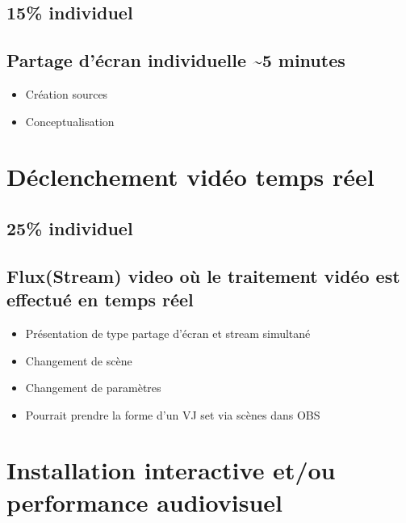 \documentclass[
]{book}
\providecommand{\tightlist}{%
  \setlength{\itemsep}{0pt}\setlength{\parskip}{0pt}}
\begin{document}
\hypertarget{individuel-3}{%
\subsection{15\% individuel}\label{individuel-3}}

\hypertarget{partage-duxe9cran-individuelle-5-minutes}{%
\subsection{Partage d'écran individuelle \textasciitilde5 minutes}\label{partage-duxe9cran-individuelle-5-minutes}}

\begin{itemize}
\tightlist
\item
  Création sources
\item
  Conceptualisation
\end{itemize}

\hypertarget{evaluation_5}{%
\section{Déclenchement vidéo temps réel}\label{evaluation_5}}

\hypertarget{individuel-4}{%
\subsection{25\% individuel}\label{individuel-4}}

\hypertarget{fluxstream-video-ouxf9-le-traitement-viduxe9o-est-effectuuxe9-en-temps-ruxe9el}{%
\subsection{Flux(Stream) video où le traitement vidéo est effectué en temps réel}\label{fluxstream-video-ouxf9-le-traitement-viduxe9o-est-effectuuxe9-en-temps-ruxe9el}}

\begin{itemize}
\tightlist
\item
  Présentation de type partage d'écran et stream simultané
\item
  Changement de scène
\item
  Changement de paramètres
\item
  Pourrait prendre la forme d'un VJ set via scènes dans OBS
\end{itemize}

\hypertarget{evaluation_6}{%
\section{Installation interactive et/ou performance audiovisuel}\label{evaluation_6}}
\end{document}

